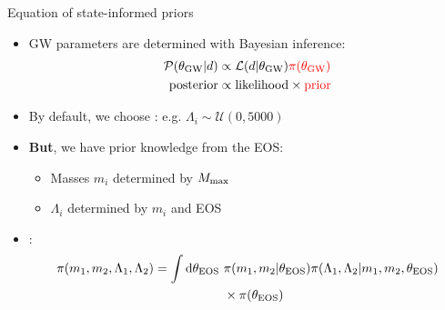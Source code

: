 \documentclass[usenames,dvipsnames,t]{beamer}
\begin{document}
\begin{frame}{Equation of state-informed priors}
  \def\x{4mm}
  \def\y{1mm}

  \begin{itemize}
    \item GW parameters are determined with Bayesian inference:
    \begin{align*}
      \mathcal{P}(\theta_{\rm{GW}} | d ) &\propto \mathcal{L}(d | \theta_{\rm{GW}}) \textcolor{red}{\pi(\theta_{\rm{GW}})} \\
      \rm{posterior} &\propto \rm{likelihood} \times \rm{\textcolor{red}{prior}} \\
    \end{align*}

    \vspace{-4mm}

    \item By default, we choose \textbf{}: e.g. $\Lambda_i \sim \mathcal{U}(0, 5000)$

    \vspace{\x}
    \pause

    \item \textbf{But}, we have prior knowledge from the EOS:
    \begin{itemize}
      \vspace{\y}
      \item Masses $m_i$ determined by $M_{\rm{max}}$

      \vspace{\y}

      \item $\Lambda_i$ determined by $m_i$ and EOS
    \end{itemize}
    
    \vspace{\x}
    \pause
    
    \item \textbf{}:
    \begin{align*}
      \pi(m_1, m_2, \Lambda_1, \Lambda_2) = \int \mathop{}\!\mathrm{d} \theta_{\rm{EOS}} \ &\pi(m_1, m_2 | \theta_{\rm{EOS}}) \pi(\Lambda_1, \Lambda_2 | m_1, m_2, \theta_{\rm{EOS}}) \\
      &\times \pi(\theta_{\rm{EOS}})
    \end{align*}
  \end{itemize}
\end{frame}
\end{document}
